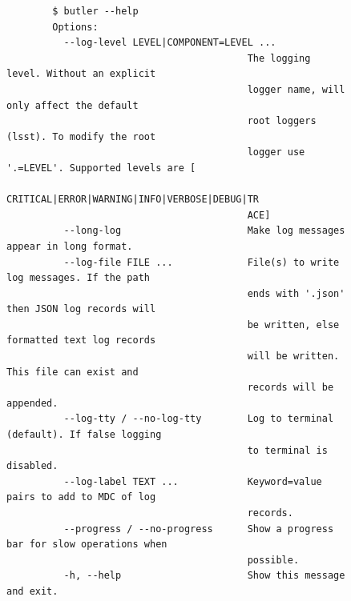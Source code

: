 \documentclass[]{spie}
\begin{document}
\begin{figure}
    \begin{small}
    \begin{verbatim}
        $ butler --help
        Options:
          --log-level LEVEL|COMPONENT=LEVEL ...
                                          The logging level. Without an explicit
                                          logger name, will only affect the default
                                          root loggers (lsst). To modify the root
                                          logger use '.=LEVEL'. Supported levels are [
                                          CRITICAL|ERROR|WARNING|INFO|VERBOSE|DEBUG|TR
                                          ACE]
          --long-log                      Make log messages appear in long format.
          --log-file FILE ...             File(s) to write log messages. If the path
                                          ends with '.json' then JSON log records will
                                          be written, else formatted text log records
                                          will be written. This file can exist and
                                          records will be appended.
          --log-tty / --no-log-tty        Log to terminal (default). If false logging
                                          to terminal is disabled.
          --log-label TEXT ...            Keyword=value pairs to add to MDC of log
                                          records.
          --progress / --no-progress      Show a progress bar for slow operations when
                                          possible.
          -h, --help                      Show this message and exit.


\end{verbatim}
\end{small}
\end{figure}
\end{document}
